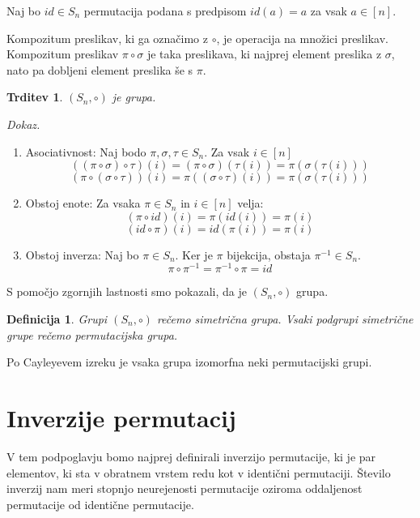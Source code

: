 \documentclass[a4paper, 12pt]{book}
\newtheorem{definicija}{Definicija}[chapter]
\newtheorem{trditev}{Trditev}[chapter]
\newenvironment{dokaz}{\emph{Dokaz.}\ }{\hspace{\fill}{$\Box$}}
\begin{document}
Naj bo $id \in S_n$ permutacija podana s predpisom $id(a) = a$ za vsak $a \in [n]$.

Kompozitum preslikav, ki ga označimo z $\circ$, je operacija na množici preslikav. Kompozitum preslikav $\pi \circ \sigma$ je taka preslikava, ki najprej element preslika z $\sigma$, nato pa dobljeni element preslika še s $\pi$.

\begin{trditev}
    $(S_n, \circ)$ je grupa.
\end{trditev}
\begin{dokaz}
    \begin{enumerate}
        \item Asociativnost: Naj bodo $\pi, \sigma, \tau \in S_n$. Za vsak $i \in [n]$ 
        \[
            ((\pi \circ \sigma) \circ \tau)(i) = (\pi \circ \sigma)(\tau(i)) = \pi(\sigma(\tau(i)))
        \]
        \[
            (\pi \circ (\sigma \circ \tau))(i) = \pi((\sigma \circ \tau)(i)) = \pi(\sigma(\tau(i))) 
        \]
        \item Obstoj enote: Za vsaka $\pi \in S_n$ in $i \in [n]$ velja:
        \[
            (\pi \circ id)(i) = \pi(id(i)) = \pi(i)
        \]
        \[
            (id \circ \pi)(i) = id(\pi(i)) = \pi(i)
        \]
        \item Obstoj inverza: Naj bo $\pi \in S_n$. Ker je $\pi$ bijekcija, obstaja $\pi^{-1} \in S_n$.
        \[
            \pi \circ \pi^{-1} = \pi^{-1} \circ \pi = id
        \]
    \end{enumerate}
    S pomočjo zgornjih lastnosti smo pokazali, da je $(S_n, \circ)$ grupa.
\end{dokaz}

\begin{definicija}
    Grupi $(S_n, \circ)$ rečemo simetrična grupa. Vsaki podgrupi simetrične grupe rečemo permutacijska grupa.
\end{definicija}
Po Cayleyevem izreku \cite{dsSkripta} je vsaka grupa izomorfna neki permutacijski grupi.


\section{ Inverzije permutacij }

V tem podpoglavju bomo najprej definirali inverzijo permutacije, ki je par elementov, ki sta v obratnem vrstem redu kot v identični permutaciji. Število inverzij nam meri stopnjo neurejenosti permutacije oziroma oddaljenost permutacije od identične permutacije. 
\end{document}
